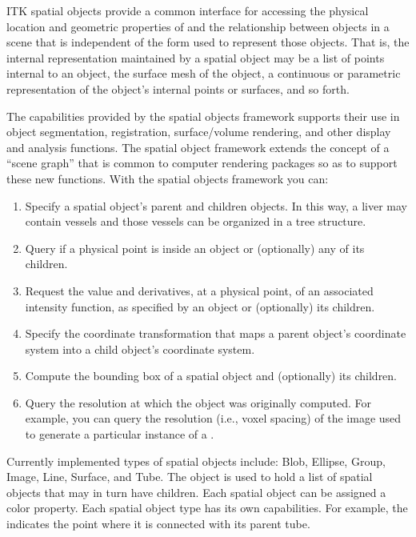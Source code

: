 ITK spatial objects provide a common interface for accessing the physical
location and geometric properties of and the relationship between objects in
a scene that is independent of the form used to represent those objects. That
is, the internal representation maintained by a spatial object may be a list
of points internal to an object, the surface mesh of the object, a continuous
or parametric representation of the object's internal points or surfaces, and
so forth.

The capabilities provided by the spatial objects framework supports their use
in object segmentation, registration, surface/volume rendering, and other
display and analysis functions. The spatial object framework extends the
concept of a ``scene graph'' that is common to computer
rendering packages so as to support these new functions. With the spatial
objects framework you can:
\begin{enumerate}

        \item Specify a spatial object's parent and children objects. In
        this way, a liver may contain vessels and those vessels can be
        organized in a tree structure.

        \item Query if a physical point is inside an object or
        (optionally) any of its children.

        \item Request the value and derivatives, at a physical point,
        of an associated intensity function, as specified
        by an object or (optionally) its children.

        \item Specify the coordinate transformation that maps a parent
        object's coordinate system into a child object's coordinate system.

        \item Compute the bounding box of a spatial object and (optionally)
        its children.

        \item Query the resolution at which the object was originally
        computed.  For example, you can query the resolution (i.e., voxel
        spacing) of the image used to generate a particular instance of a
        .
\end{enumerate}

Currently implemented types of spatial objects include: Blob, Ellipse, Group,
Image, Line, Surface, and Tube. The  object is used to hold
a list of spatial objects that may in turn have children. Each spatial
object can be assigned a color property. Each spatial object type has its
own capabilities. For example, the  indicates the
point where it is connected with its parent tube.

